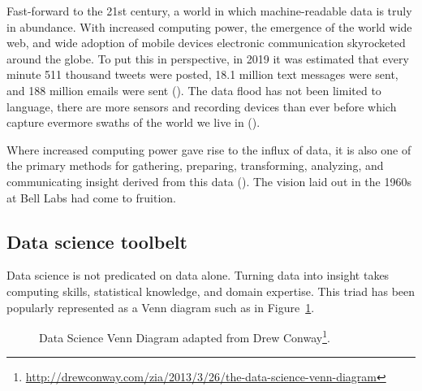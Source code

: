 \documentclass[
  letterpaper,
]{latex/krantz}
\theoremstyle{definition}
\theoremstyle{remark}
\DeclareRobustCommand{\href}[2]{#2\footnote{\url{#1}}}
\begin{document}
Fast-forward to the 21st century, a world in which machine-readable data
is truly in abundance. With increased computing power, the emergence of
the world wide web, and wide adoption of mobile devices electronic
communication skyrocketed around the globe. To put this in perspective,
in 2019 it was estimated that every minute 511 thousand tweets were
posted, 18.1 million text messages were sent, and 188 million emails
were sent (). The data flood has not been limited to
language, there are more sensors and recording devices than ever before
which capture evermore swaths of the world we live in
().

Where increased computing power gave rise to the influx of data, it is
also one of the primary methods for gathering, preparing, transforming,
analyzing, and communicating insight derived from this data
(). The vision laid out in the
1960s at Bell Labs had come to fruition.

\subsection{Data science toolbelt}\label{data-science-toolbelt}

Data science is not predicated on data alone. Turning data into insight
takes computing skills, statistical knowledge, and domain expertise.
This triad has been popularly represented as a Venn diagram such as in
Figure~\ref{fig-intro-data-science-venn}.

\begin{figure}[H]


\caption{\label{fig-intro-data-science-venn}Data Science Venn Diagram
adapted from
\href{http://drewconway.com/zia/2013/3/26/the-data-science-venn-diagram}{Drew
Conway}.}

\end{figure}%
\end{document}
